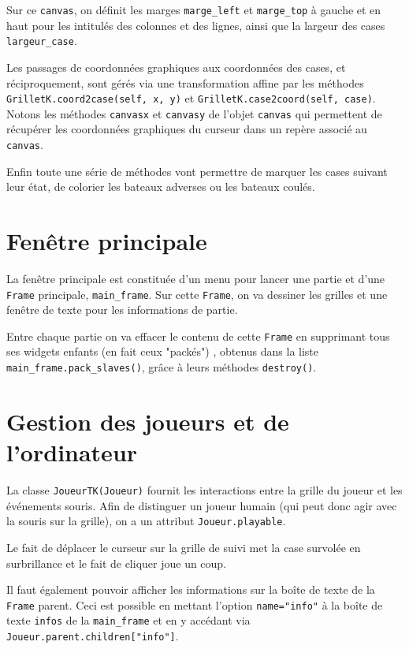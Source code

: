 Sur ce \texttt{canvas}, on définit les marges \texttt{marge\_left} et \texttt{marge\_top} à gauche et en haut pour les intitulés des colonnes et des lignes, ainsi que la largeur des cases \texttt{largeur\_case}. 

\medskip

Les passages de coordonnées graphiques aux coordonnées des cases, et réciproquement, sont gérés via  une transformation affine par les méthodes \texttt{GrilletK.coord2case(self, x, y)} et \texttt{GrilletK.case2coord(self, case)}. Notons les méthodes \texttt{canvasx} et \texttt{canvasy} de l'objet \texttt{canvas} qui permettent de récupérer les coordonnées graphiques du curseur dans un repère associé au \texttt{canvas}.

\medskip

Enfin toute une série de méthodes vont permettre de marquer les cases suivant leur état, de colorier les bateaux adverses ou les bateaux coulés.  

\section{Fenêtre principale}
La fenêtre principale est constituée d'un menu pour lancer une partie et d'une \texttt{Frame} principale, \texttt{main\_frame}. Sur cette \texttt{Frame}, on va dessiner les grilles et une fenêtre de texte pour les informations de partie.

\medskip

Entre chaque partie on va effacer le contenu de cette \texttt{Frame} en supprimant tous ses widgets enfants (en fait ceux "packés") , obtenus dans la liste \texttt{main\_frame.pack\_slaves()}, grâce à leurs méthodes \texttt{destroy()}. 

\section{Gestion des joueurs et de l'ordinateur}
La classe \texttt{JoueurTK(Joueur)} fournit les interactions entre la grille du joueur et les événements souris. Afin de distinguer un joueur humain (qui peut donc agir avec la souris sur la grille), on a un attribut \texttt{Joueur.playable}.

Le fait de déplacer le curseur sur la grille de suivi met la case survolée en surbrillance et le fait de cliquer joue un coup.

Il faut également pouvoir afficher les informations sur la boîte de texte de la \texttt{Frame} parent. Ceci est possible  en mettant l'option \texttt{name="info"} à la boîte de texte \texttt{infos} de la \texttt{main\_frame} et en y accédant via \texttt{Joueur.parent.children["info"]}.

